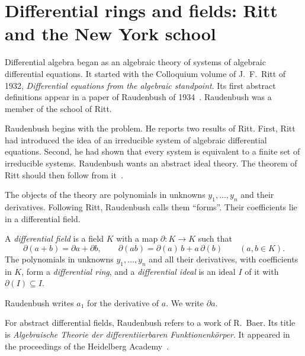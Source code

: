 \section[Differential rings and fields: Ritt and the New York school][Differential rings and fields]{Differential rings and fields: Ritt and the New York school}\label{sec:origins:differential-algebra}

Differential algebra began as an algebraic theory of systems of algebraic
differential equations. It started with the Colloquium volume of J.~F.~Ritt of
1932, \emph{Differential equations from the algebraic standpoint}. Its first
abstract definitions appear in a paper of Raudenbush of
1934~\cite{Raudenbush1934}. Raudenbush was a member of the school of Ritt.

Raudenbush begins with the problem. He reports two results of Ritt. First, Ritt had introduced the idea
of an irreducible system of algebraic differential equations. Second, he had
shown that every system is equivalent to a finite set of irreducible systems.
Raudenbush wants an abstract ideal theory. The theorem of Ritt should then
follow from it~\cite[p.~361]{Raudenbush1934}.

The objects of the theory are polynomials in unknowns $y_1, \ldots, y_n$ and their
derivatives. Following Ritt, Raudenbush calls them ``forms''. Their
coefficients lie in a differential field.

\begin{definition}\label{def:origins:differential-field}
A \emph{differential field} is a field $K$ with a map $\partial\colon K \to K$
such that
\[
\partial(a+b) = \partial a + \partial b, \qquad \partial(ab) = \partial(a)\, b + a\, \partial(b)
\qquad (a, b \in K).
\]
The polynomials in unknowns $y_1, \ldots, y_n$ and all their derivatives, with
coefficients in $K$, form a \emph{differential ring}, and a
\emph{differential ideal} is an ideal $I$ of it with $\partial(I) \subseteq I$.
\end{definition}

Raudenbush writes $a_1$ for the derivative of $a$. We write $\partial a$.

For abstract differential fields, Raudenbush refers to a work of R.~Baer. Its
title is \emph{Algebraische Theorie der differentiierbaren
Funktionenk\"orper}. It appeared in the proceedings of the Heidelberg
Academy~\cite[p.~361, footnote]{Raudenbush1934}.


